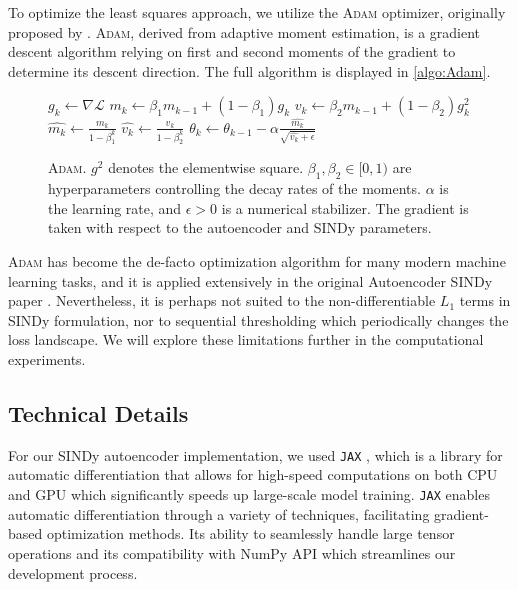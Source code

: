 To optimize the least squares approach, we utilize the \textsc{Adam} optimizer, originally proposed by \textcite{Adam}. \textsc{Adam}, derived from adaptive moment estimation, is a gradient descent algorithm relying on first and second moments of the gradient to determine its descent direction. The full algorithm is displayed in \autoref{algo:Adam}.
\begin{figure}[h]
    \begin{algorithm}[H]
    \caption{\textsc{Adam}. $g^2$ denotes the elementwise square. $\beta_1,\beta_2\in [0,1) $ are hyperparameters controlling the decay rates of the moments. $\alpha$ is the learning rate, and $\epsilon>0$ is a numerical stabilizer. 
    The gradient is taken with respect to the autoencoder and SINDy parameters.}
    \label{algo:Adam} 
       \begin{algorithmic}
        \State \( g_{k} \gets \nabla\mathcal{L} \)
        \State \(m_k \gets \beta_1 m_{k-1} + (1-\beta_1)g_k\) 
        \State \(v_k \gets \beta_2 m_{k-1} + (1-\beta_2)g_k^2\)
        \State \(\hat{m_k} \gets \frac{m_k}{1-\beta_1^k}\)
        \State \(\hat{v_k} \gets \frac{v_k}{1-\beta_2^k}\)
        \State \(\theta_k \gets \theta_{k-1} - \alpha \frac{ \hat{m_k}}{\sqrt{\hat{v_k}+ \epsilon}}\)
        \end{algorithmic}
    \end{algorithm}
\end{figure}


\textsc{Adam} has become the de-facto optimization algorithm for many modern machine learning tasks, and it is applied extensively in the original Autoencoder SINDy paper \cite{Champion_2019}. Nevertheless, it is perhaps not suited to the non-differentiable $L_1$ terms in SINDy formulation, nor to sequential thresholding which periodically changes the loss landscape. We will explore these limitations further in the computational experiments. 

\subsection{Technical Details}
For our SINDy autoencoder implementation, we used \verb|JAX| \cite{jax2018github}, which is a library for automatic differentiation that allows for high-speed computations on both CPU and GPU which significantly speeds up large-scale model training. 
\verb|JAX| enables automatic differentiation through a variety of techniques, facilitating gradient-based optimization methods. 
Its ability to seamlessly handle large tensor operations and its compatibility with NumPy API which streamlines our development process. 

